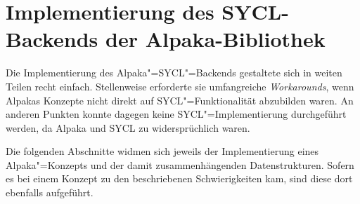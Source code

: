 \chapter{Implementierung des SYCL-Backends der Alpaka-Bibliothek}
\label{implementierung}

Die Implementierung des Alpaka"=SYCL"=Backends gestaltete sich in weiten Teilen
recht einfach. Stellenweise erforderte sie umfangreiche \textit{Workarounds},
wenn Alpakas Konzepte nicht direkt auf SYCL"=Funktionalität abzubilden waren.
An anderen Punkten konnte dagegen keine SYCL"=Implementierung durchgeführt
werden, da Alpaka und SYCL zu widersprüchlich waren.

Die folgenden Abschnitte widmen sich jeweils der Implementierung eines
Alpaka"=Konzepts und der damit zusammenhängenden Datenstrukturen. Sofern es bei
einem Konzept zu den beschriebenen Schwierigkeiten kam, sind diese dort
ebenfalls aufgeführt.

